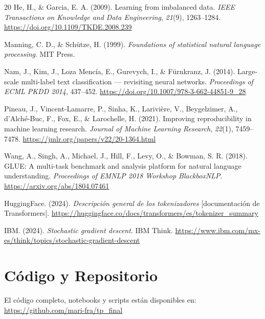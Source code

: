 \documentclass[11pt,a4paper]{article}
\begin{document}
\begin{thebibliography}{20}
He, H., \& Garcia, E. A. (2009). Learning from imbalanced data. \textit{IEEE Transactions on Knowledge and Data Engineering}, \textit{21}(9), 1263--1284. \url{https://doi.org/10.1109/TKDE.2008.239}

Manning, C. D., \& Schütze, H. (1999). \textit{Foundations of statistical natural language processing}. MIT Press.

Nam, J., Kim, J., Loza Mencía, E., Gurevych, I., \& Fürnkranz, J. (2014). Large-scale multi-label text classification --- revisiting neural networks. \textit{Proceedings of ECML PKDD 2014}, 437--452. \url{https://doi.org/10.1007/978-3-662-44851-9_28}

Pineau, J., Vincent-Lamarre, P., Sinha, K., Larivière, V., Beygelzimer, A., d'Alché-Buc, F., Fox, E., \& Larochelle, H. (2021). Improving reproducibility in machine learning research. \textit{Journal of Machine Learning Research}, \textit{22}(1), 7459--7478. \url{https://jmlr.org/papers/v22/20-1364.html}

Wang, A., Singh, A., Michael, J., Hill, F., Levy, O., \& Bowman, S. R. (2018). GLUE: A multi-task benchmark and analysis platform for natural language understanding. \textit{Proceedings of EMNLP 2018 Workshop BlackboxNLP}. \url{https://arxiv.org/abs/1804.07461}

HuggingFace. (2024). \textit{Descripción general de los tokenizadores} [documentación de Transformers]. \url{https://huggingface.co/docs/transformers/es/tokenizer_summary}

IBM. (2024). \textit{Stochastic gradient descent}. IBM Think. \url{https://www.ibm.com/mx-es/think/topics/stochastic-gradient-descent}

\end{thebibliography}

\appendix
\section{Código y Repositorio}

El código completo, notebooks y scripts están disponibles en:
\url{https://github.com/mari-fra/tp_final}
\end{document}
